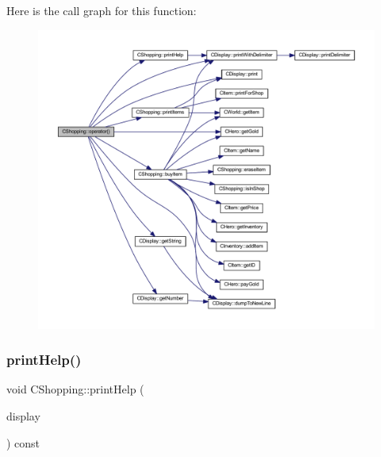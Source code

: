 Here is the call graph for this function\+:\nopagebreak
\begin{figure}[H]
\begin{center}
\leavevmode
\includegraphics[width=350pt]{class_c_shopping_ab72dff2e94f897bd5c3f1ef660e65afb_cgraph}
\end{center}
\end{figure}
\mbox{\label{class_c_shopping_a5d075417297809f43042d74da0fdaad5}} 
\subsubsection{\texorpdfstring{print\+Help()}{printHelp()}}
{\footnotesize\ttfamily void C\+Shopping\+::print\+Help (\begin{DoxyParamCaption}\item[{const \mbox{\hyperlink{class_c_display}{C\+Display}} \&}]{display }\end{DoxyParamCaption}) const\hspace{0.3cm}{\ttfamily [protected]}}

